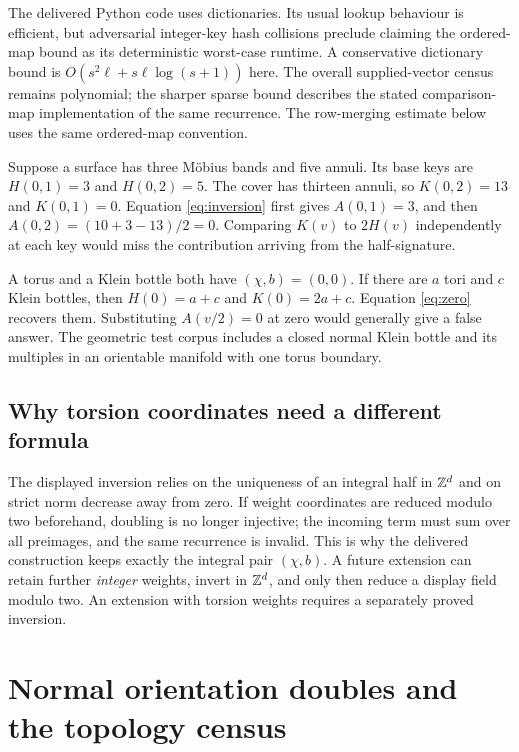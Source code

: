 The delivered Python code uses dictionaries. Its usual lookup behaviour
is efficient, but adversarial integer-key hash collisions preclude claiming
the ordered-map bound as its deterministic worst-case runtime. A
conservative dictionary bound is $O(s^2\ell+s\ell\log(s+1))$ here.
The overall supplied-vector census remains polynomial; the sharper sparse
bound describes the stated comparison-map implementation of the same
recurrence. The row-merging estimate below uses the same ordered-map
convention.

\begin{example}
Suppose a surface has three M\"obius bands and five annuli. Its base keys are
$H(0,1)=3$ and $H(0,2)=5$. The cover has thirteen annuli, so
$K(0,2)=13$ and $K(0,1)=0$. Equation \eqref{eq:inversion} first gives
$A(0,1)=3$, and then
$A(0,2)=(10+3-13)/2=0$. Comparing $K(v)$ to $2H(v)$ independently at
each key would miss the contribution arriving from the half-signature.
\end{example}

\begin{example}
A torus and a Klein bottle both have $(\chi,b)=(0,0)$. If there are $a$
tori and $c$ Klein bottles, then $H(0)=a+c$ and $K(0)=2a+c$.
Equation \eqref{eq:zero} recovers them. Substituting $A(v/2)=0$ at zero
would generally give a false answer. The geometric test corpus includes
a closed normal Klein bottle and its multiples in an orientable manifold
with one torus boundary.
\end{example}

\subsection{Why torsion coordinates need a different formula}

The displayed inversion relies on the uniqueness of an integral half in
$\mathbb Z^d$ and on strict norm decrease away from zero. If weight coordinates
are reduced modulo two beforehand, doubling is no longer injective; the
incoming term must sum over all preimages, and the same recurrence is
invalid. This is why the delivered construction keeps exactly the integral
pair $(\chi,b)$. A future extension can retain further \emph{integer}
weights, invert in $\mathbb Z^d$, and only then reduce a display field modulo two.
An extension with torsion weights requires a separately proved inversion.

\section{Normal orientation doubles and the topology census}
\label{sec:census}

